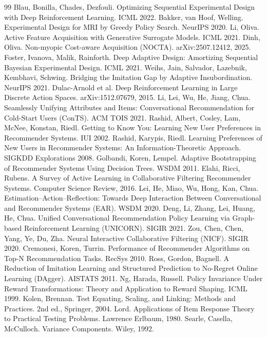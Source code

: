 \documentclass[11pt]{article}
\begin{document}
\begin{thebibliography}{99}\small
{} Blau, Bonilla, Chades, Dezfouli. Optimizing Sequential Experimental Design with Deep Reinforcement Learning. ICML 2022.
 Bakker, van Hoof, Welling. Experimental Design for MRI by Greedy Policy Search. NeurIPS 2020.
 Li, Oliva. Active Feature Acquisition with Generative Surrogate Models. ICML 2021.
 Dinh, Oliva. Non-myopic Cost-aware Acquisition (NOCTA). arXiv:2507.12412, 2025.
 Foster, Ivanova, Malik, Rainforth. Deep Adaptive Design: Amortizing Sequential Bayesian Experimental Design. ICML 2021.
 Weihs, Jain, Salvador, Lazebnik, Kembhavi, Schwing. Bridging the Imitation Gap by Adaptive Insubordination. NeurIPS 2021.
 Dulac-Arnold et al. Deep Reinforcement Learning in Large Discrete Action Spaces. arXiv:1512.07679, 2015.
 Li, Lei, Wu, He, Jiang, Chua. Seamlessly Unifying Attributes and Items: Conversational Recommendation for Cold-Start Users (ConTS). ACM TOIS 2021.
 Rashid, Albert, Cosley, Lam, McNee, Konstan, Riedl. Getting to Know You: Learning New User Preferences in Recommender Systems. IUI 2002.
 Rashid, Karypis, Riedl. Learning Preferences of New Users in Recommender Systems: An Information-Theoretic Approach. SIGKDD Explorations 2008.
 Golbandi, Koren, Lempel. Adaptive Bootstrapping of Recommender Systems Using Decision Trees. WSDM 2011.
 Elahi, Ricci, Rubens. A Survey of Active Learning in Collaborative Filtering Recommender Systems. Computer Science Review, 2016.
 Lei, He, Miao, Wu, Hong, Kan, Chua. Estimation--Action--Reflection: Towards Deep Interaction Between Conversational and Recommender Systems (EAR). WSDM 2020.
 Deng, Li, Zhang, Lei, Huang, He, Chua. Unified Conversational Recommendation Policy Learning via Graph-based Reinforcement Learning (UNICORN). SIGIR 2021.
 Zou, Chen, Chen, Yang, Ye, Du, Zha. Neural Interactive Collaborative Filtering (NICF). SIGIR 2020.
 Cremonesi, Koren, Turrin. Performance of Recommender Algorithms on Top-N Recommendation Tasks. RecSys 2010.
 Ross, Gordon, Bagnell. A Reduction of Imitation Learning and Structured Prediction to No-Regret Online Learning (DAgger). AISTATS 2011.
 Ng, Harada, Russell. Policy Invariance Under Reward Transformations: Theory and Application to Reward Shaping. ICML 1999.
 Kolen, Brennan. Test Equating, Scaling, and Linking: Methods and Practices. 2nd ed., Springer, 2004.
 Lord. Applications of Item Response Theory to Practical Testing Problems. Lawrence Erlbaum, 1980.
 Searle, Casella, McCulloch. Variance Components. Wiley, 1992.
\end{thebibliography}
\end{document}
